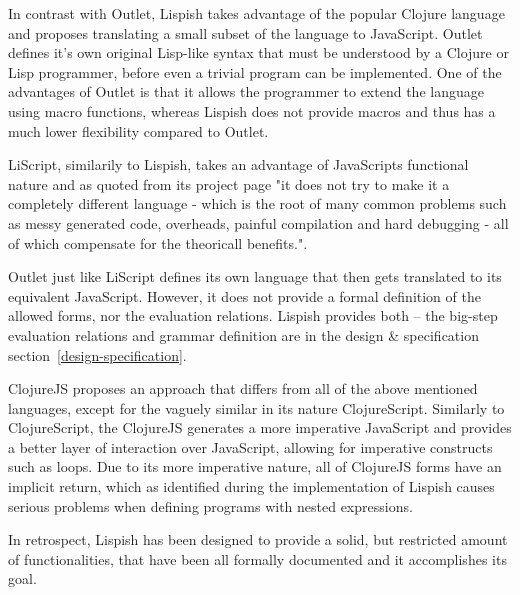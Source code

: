 In contrast with Outlet, Lispish takes advantage of the popular Clojure language and proposes translating a small subset of the language to JavaScript. Outlet defines it's own original Lisp-like syntax that must be understood by a Clojure or Lisp programmer, before even a trivial program can be implemented.
One of the advantages of Outlet is that it allows the programmer to extend the language using macro functions, whereas Lispish does not provide macros and thus has a much lower flexibility compared to Outlet. 

LiScript, similarily to Lispish, takes an advantage of JavaScripts functional nature and as quoted from its project page "it does not try to make it a completely different language - which is the root of many common problems such as messy generated code, overheads, painful compilation and hard debugging - all of which compensate for the theoricall benefits."\cite{LiScript:2013:Site}.

Outlet just like LiScript defines its own language that then gets translated to its equivalent JavaScript. However, it does not provide a formal definition of the allowed forms, nor the evaluation relations. Lispish provides both -- the big-step evaluation relations and grammar definition are in the design \& specification section~\ref{design-specification}.

ClojureJS proposes an approach that differs from all of the above mentioned languages, except for the vaguely similar in its nature ClojureScript. Similarly to ClojureScript, the ClojureJS generates a more imperative JavaScript and provides a better layer of interaction over JavaScript, allowing for imperative constructs such as loops. 
Due to its more imperative nature, all of ClojureJS forms have an implicit return, which as identified during the implementation of Lispish causes serious problems when defining programs with nested expressions. 

In retrospect, Lispish has been designed to provide a solid, but restricted amount of functionalities, that have been all formally documented and it accomplishes its goal.
